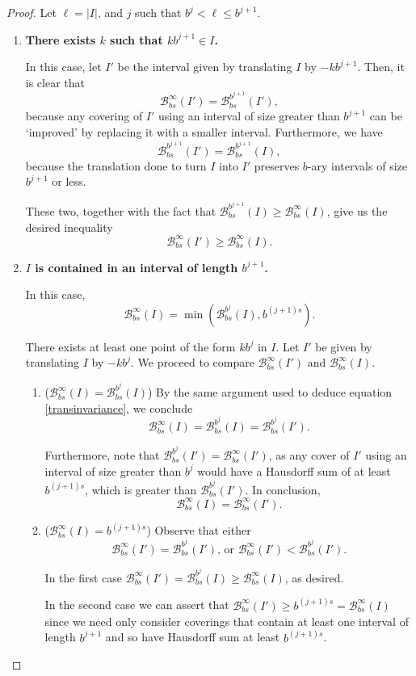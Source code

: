 \documentclass[11pt, reqno]{amsart}
\newcommand{\BB}{\mathcal{B}}
\begin{document}
\begin{proof}
Let $\ell = \lvert I \rvert$, and $j$ such that $b^j < \ell \leq b^{j+1}$.

\begin{enumerate}[label=\textbf{Case \arabic*:}]

\item \textbf{There exists $k$ such that $k b^{j+1} \in I$.}

In this case, let $I'$ be the interval given by translating $I$ by $-k b^{j+1}$. Then, it is clear that
\[\BB_{bs}^\infty(I') = \BB_{bs}^{b^{j+1}}(I'),\]
because any covering of $I'$ using an interval of size greater than $b^{j+1}$ can be `improved' by replacing it with a smaller interval. Furthermore, we have
\begin{equation}\label{transinvariance}
\BB_{bs}^{b^{j+1}}(I') = \BB_{bs}^{b^{j+1}}(I),
\end{equation}
because the translation done to turn $I$ into $I'$ preserves $b$-ary intervals of size $b^{j+1}$ or less.

These two, together with the fact that $\BB_{bs}^{b^{j+1}}(I) \geq \BB_{bs}^\infty(I)$, give us the desired inequality
\[\BB_{bs}^\infty(I') \geq \BB_{bs}^\infty(I).\]

\item \textbf{$I$ is contained in an interval of length $b^{j+1}$.}

In this case, 
\[\BB_{bs}^\infty(I) = \min(\BB_{bs}^{b^j}(I), b^{(j+1)s}).\]

There exists at least one point of the form $k b^j$ in $I$. Let $I'$ be given by translating $I$ by $-k b^j$. We proceed to compare $\BB_{bs}^\infty(I')$ and $\BB_{bs}^\infty(I)$.

\begin{enumerate}[label=\textbf{Subcase \roman*)}]

\item ($\BB_{bs}^\infty(I) = \BB_{bs}^{b^j}(I)$) By the same argument used to deduce equation \eqref{transinvariance}, we conclude
\[\BB_{bs}^\infty(I) = \BB_{bs}^{b^j}(I) = \BB_{bs}^{b^j}(I').\]

Furthermore, note that $\BB_{bs}^{b^j}(I') = \BB_{bs}^{\infty}(I')$, as any cover of $I'$ using an interval of size greater than $b^j$ would have a Hausdorff sum of at least $b^{(j+1)s}$, which is greater than $\BB_{bs}^{b^j}(I')$. In conclusion,
\[\BB_{bs}^\infty(I) = \BB_{bs}^\infty(I').\]

\item ($\BB_{bs}^\infty(I) = b^{(j+1)s}$) Observe that either
\[\BB_{bs}^\infty(I') = \BB_{bs}^{b^j}(I') \text{, or } \BB_{bs}^\infty(I') < \BB_{bs}^{b^j}(I').\]

In the first case $\BB_{bs}^\infty(I') = \BB_{bs}^{b^j}(I) \geq \BB_{bs}^\infty(I)$, as desired.

In the second case we can assert that $\BB_{bs}^\infty(I') \geq b^{(j+1)s} = \BB_{bs}^\infty(I)$ since we need only consider coverings that contain at least one interval of length $b^{j+1}$ and so have Hausdorff sum  at least $b^{(j+1)s}$.
\end{enumerate}
\end{enumerate}
\end{proof}
\end{document}
